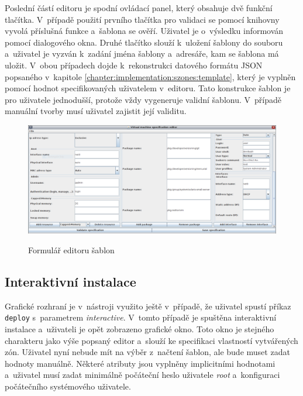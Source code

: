 Poslední částí editoru je spodní ovládací panel, který obsahuje dvě funkční tlačítka. V~případě použití prvního tlačítka
pro validaci se pomocí knihovny vyvolá příslušná funkce a~šablona se ověří. Uživatel je o~výsledku informován pomocí dialogového
okna. Druhé tlačítko slouží k~uložení šablony do souboru a~uživatel je vyzván k~zadání jména šablony a~adresáře, kam se šablona má uložit.
V~obou případech dojde k~rekonstrukci datového formátu JSON popsaného v~kapitole \ref{chapter:implementation:szones:template},
který je vyplněn pomocí hodnot specifikovaných uživatelem v~editoru. Tato konstrukce šablon je pro uživatele jednodušší, protože
vždy vygeneruje validní šablonu. V~případě manuální tvorby musí uživatel zajistit její validitu.
\begin{figure}
    \centering    
    \caption{Formulář editoru šablon}
    \includegraphics[scale=0.35]{assets/pdfs/implemetation_gui_form.png}
    \label{image:implemetation:gui:form}
\end{figure}
\subsection{Interaktivní instalace}
\label{chapter:implementation:gui:interactive}
Grafické rozhraní je v~nástroji využito ještě v~případě, že uživatel spustí příkaz \verb|deploy| s~parametrem \textit{interactive}.
V~tomto případě je spuštěna interaktivní instalace a~uživateli je opět zobrazeno grafické okno. Toto okno je stejného charakteru
jako výše popsaný editor a~slouží ke specifikaci vlastností vytvářených zón. Uživatel nyní nebude mít na výběr z~načtení šablon, ale bude muset
zadat hodnoty manuálně. Některé atributy jsou vyplněny implicitními hodnotami a~uživatel musí zadat minimálně počáteční heslo 
uživatele \textit{root} a~konfiguraci počátečního systémového uživatele.